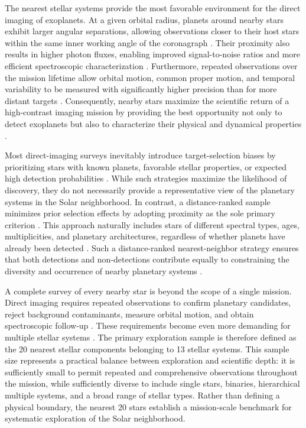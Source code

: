 The nearest stellar systems provide the most favorable environment for the direct 
imaging of exoplanets. At a given orbital radius, planets around nearby stars exhibit larger angular separations, allowing observations closer to their host stars within the same inner working angle of the coronagraph \cite{Traub2010}. 
Their proximity also results in higher photon fluxes, enabling improved signal-to-noise ratios and more efficient spectroscopic characterization \cite{LUVOIR2019}. 
Furthermore, repeated observations over the mission lifetime allow orbital motion, common proper motion, and temporal variability to be measured with significantly higher precision than for more distant targets \cite{Macintosh2015}. Consequently, nearby stars maximize the scientific return of a
high-contrast imaging mission by providing the best opportunity not only to detect
exoplanets but also to characterize their physical and dynamical properties
\cite{LUVOIR2019}.

Most direct-imaging surveys inevitably introduce target-selection biases by prioritizing stars with known planets, favorable stellar properties, or expected high detection probabilities \cite{Nielsen2019}. 
While such strategies maximize the likelihood of discovery, they do not necessarily provide a representative view of the planetary systems in the Solar neighborhood. In contrast, a distance-ranked sample minimizes prior selection effects by adopting proximity as the sole primary criterion \cite{Henry2018}. 
This approach naturally includes stars of different spectral types, ages, multiplicities, and planetary architectures, regardless of whether planets have already been detected \cite{Henry2018}. 
Such a distance-ranked nearest-neighbor strategy ensures that both detections and non-detections contribute equally to constraining the diversity and occurrence of nearby planetary systems \cite{Bowler2016}.

A complete survey of every nearby star is beyond the scope of a single mission. Direct imaging requires repeated observations to confirm planetary candidates, reject background contaminants, measure orbital motion, and obtain spectroscopic follow-up \cite{Currie2022}. 
These requirements become even more demanding for multiple stellar systems \cite{HabEx2020}. 
The primary exploration sample is therefore defined as the 20 nearest stellar components belonging to 13 stellar systems. This sample size represents a practical
balance between exploration and scientific depth: it is sufficiently small to permit repeated and comprehensive observations throughout the mission, while sufficiently diverse to include single stars, binaries, hierarchical multiple systems, and a broad range of stellar types. Rather than defining a physical boundary, the nearest 20 stars establish a mission-scale benchmark for systematic exploration of the Solar neighborhood.

